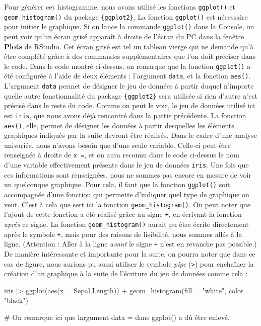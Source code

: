 \documentclass[
  letterpaper,
]{book}
\newenvironment{Shaded}{\begin{snugshade}}{\end{snugshade}}
\newcommand{\AttributeTok}[1]{\textcolor[rgb]{0.40,0.45,0.13}{#1}}
\newcommand{\CommentTok}[1]{\textcolor[rgb]{0.37,0.37,0.37}{#1}}
\newcommand{\FunctionTok}[1]{\textcolor[rgb]{0.28,0.35,0.67}{#1}}
\newcommand{\NormalTok}[1]{\textcolor[rgb]{0.00,0.23,0.31}{#1}}
\newcommand{\SpecialCharTok}[1]{\textcolor[rgb]{0.37,0.37,0.37}{#1}}
\newcommand{\StringTok}[1]{\textcolor[rgb]{0.13,0.47,0.30}{#1}}
\begin{document}
Pour générer cet histogramme, nous avons utilisé les fonctions
\texttt{ggplot()} et \texttt{geom\_histogram()} du package
\texttt{\{ggplot2\}}. La fonction \texttt{ggplot()} est nécessaire pour
initier le graphique. Si on lance la commande \texttt{ggplot()} dans la
Console, on peut voir qu'un écran grisé apparaît à droite de l'écran du
PC dans la fenêtre \textbf{Plots} de RStudio. Cet écran grisé est tel un
tableau vierge qui ne demande qu'à être complété grâce à des commandes
supplémentaires que l'on doit préciser dans le code. Dans le code montré
ci-dessus, on remarque que la fonction \texttt{ggplot()} a été
configurée à l'aide de deux éléments : l'argument \texttt{data}, et la
fonction \texttt{aes()}. L'argument \texttt{data} permet de désigner le
jeu de données à partir duquel n'importe quelle autre fonctionnalité du
package \texttt{\{ggplot2\}} sera utilisée si rien d'autre n'est précisé
dans le reste du code. Comme on peut le voir, le jeu de données utilisé
ici est \texttt{iris}, que nous avons déjà rencontré dans la partie
précédente. La fonction \texttt{aes()}, elle, permet de désigner les
données à partir desquelles les éléments graphiques indiqués par la
suite devront être réalisés. Dans le cadre d'une analyse univariée, nous
n'avons besoin que d'une seule variable. Celle-ci peut être renseignée à
droite de \texttt{x\ =}, et on aura reconnu dans le code ci-dessus le
nom d'une variable effectivement présente dans le jeu de données
\texttt{iris}. Une fois que ces informations sont renseignées, nous ne
sommes pas encore en mesure de voir un quelconque graphique. Pour cela,
il faut que la fonction \texttt{ggplot()} soit accompagnée d'une
fonction qui permette d'indiquer quel type de graphique on veut. C'est à
cela que sert ici la fonction \texttt{geom\_histogram()}. On peut noter
que l'ajout de cette fonction a été réalisé grâce au signe \texttt{+},
en écrivant la fonction \emph{après} ce signe. La fonction
\texttt{geom\_histogram()} aurait pu être écrite directement après le
symbole \texttt{+}, mais pour des raisons de lisibilité, nous sommes
allés à la ligne. (Attention : Aller à la ligne \emph{avant} le signe
\texttt{+} n'est en revanche pas possible.) De manière intéressante et
importante pour la suite, on pourra noter que dans ce cas de figure,
nous aurions pu aussi utiliser le symbole \emph{pipe}
(\texttt{\textbar{}\textgreater{}}) pour enchaîner la création d'un
graphique à la suite de l'écriture du jeu de données comme cela :

\begin{Shaded}
\begin{Highlighting}[]
\NormalTok{iris }\SpecialCharTok{|\textgreater{}}
  \FunctionTok{ggplot}\NormalTok{(}\FunctionTok{aes}\NormalTok{(}\AttributeTok{x =}\NormalTok{ Sepal.Length)) }\SpecialCharTok{+}
  \FunctionTok{geom\_histogram}\NormalTok{(}\AttributeTok{fill =} \StringTok{"white"}\NormalTok{, }\AttributeTok{color =} \StringTok{"black"}\NormalTok{)}

\CommentTok{\# On remarque ici que l\textquotesingle{}argument \textasciigrave{}data = \textasciigrave{} dans \textasciigrave{}ggplot()\textasciigrave{} a dû être enlevé.}
\end{Highlighting}
\end{Shaded}
\end{document}
